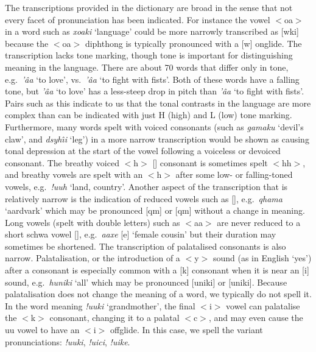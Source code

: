 The transcriptions provided in the dictionary are broad in the sense
that not every facet of pronunciation has been indicated. For instance
the vowel $<$oa$>$ in a word such as
\emph{\textipa{\textdoublebarpipe}xoaki} `language' could be more
narrowly transcribed as
[\textipa{\textdoublebarpipe}wki] because the
$<$oa$>$ diphthong is typically pronounced with a [w] onglide. The
transcription lacks tone marking, though tone is important for
distinguishing meaning in the language. There are about 70 words that
differ only in tone, e.g.\ \emph{\textipa{\textdoublevertline}'\^{a}a}
`to love', vs.\ \emph{\textipa{\textdoublevertline}'\^{a}a} `to fight
with fists'. Both of these words have a falling tone, but
\emph{\textipa{\textdoublevertline}'\^{a}a} `to love' has a less-steep
drop in pitch than \emph{\textipa{\textdoublevertline}'\^{a}a} `to
fight with fists'. Pairs such as this indicate to us that the tonal
contrasts in the language are more complex than can be indicated with
just H (high) and L (low) tone marking. Furthermore, many words spelt
with voiced consonants (such as \emph{gamaku} `devil's claw', and
\emph{dsyh\^{\i}i} `leg') in a more narrow transcription would be
shown as causing tonal depression at the start of the vowel following
a voiceless or devoiced consonant.  The breathy voiced $<$h$>$
[] consonant is sometimes spelt $<$hh$>$, and breathy
vowels are spelt with an $<$h$>$ after some low- or falling-toned
vowels, e.g.\ \emph{!uuh} `land, country'. Another aspect of the
transcription that is relatively narrow is the indication of reduced
vowels such as [], e.g.\
\emph{\textipa{\textdoublevertline}qhama} `aardvark' which may be
pronounced
[\textipa{\textdoublevertline}qm]
or
[\textipa{\textdoublevertline}qm]
without a change in meaning. Long vowels (spelt with double letters)
such as $<$aa$>$ are never reduced to a short schwa vowel
[], e.g.\ \emph{\textipa{\textvertline}aaxe}
[\textipa{\textvertline}\textipa{A}e] `female
cousin' but their duration may sometimes be shortened. The
transcription of palatalised consonants is also narrow.
Palatalisation, or the introduction of a $<$y$>$ sound (as in English
`yes') after a consonant is especially common with a [k] consonant
when it is near an [i] sound, e.g.\ \emph{huniki} `all' which may be
pronounced [uniki] or [\textipa{H}unik\super{j}i]. Because
palatalisation does not change the meaning of a word, we typically do
not spell it. In the word meaning \emph{!uuki} `grandmother', the
final $<$i$>$ vowel can palatalise the $<$k$>$ consonant, changing it
to a palatal $<$c$>$, and may even cause the uu vowel to have an
$<$i$>$ offglide. In this case, we spell the variant pronunciations:
\emph{!uuki}, \emph{!uici}, \emph{!uike}.\\

